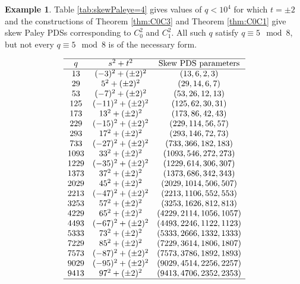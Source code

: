 \documentclass[12pt, a4paper]{article}
\theoremstyle{definition}
\newtheorem{example}[theorem]{Example}
\begin{document}
\begin{example}
Table \ref{tab:skewPaleye=4} gives values of $q<10^4$ for which $t=\pm 2$ and the constructions of Theorem \ref{thm:C0C3} and Theorem \ref{thm:C0C1} give skew Paley PDSs corresponding to $C_0^2$ and $C_1^2$. All such $q$ satisfy $q \equiv 5 \mod 8$, but not every $q \equiv 5 \mod 8$ is of the necessary form.

\begin{table}[h]
	\centering
	\[
	\begin{array}{ccc}
		\hline
		q & s^2+t^2 & \text{Skew PDS parameters} \\
		\hline
		13 & (-3)^2+(\pm2)^2 & (13,6,2,3) \\
		29 & 5^2+(\pm2)^2 & (29,14,6,7) \\
		53 & (-7)^2+(\pm2)^2 & (53,26,12,13) \\
		125 & (-11)^2+(\pm2)^2 & (125,62,30,31) \\
		173 & 13^2+(\pm2)^2 & (173,86,42,43) \\
		229 & (-15)^2+(\pm2)^2 & (229,114,56,57) \\
		293 & 17^2+(\pm2)^2 & (293,146,72,73) \\
		733 & (-27)^2+(\pm2)^2 & (733,366,182,183) \\
		1093 & 33^2+(\pm2)^2 & (1093,546,272,273) \\
		1229 & (-35)^2+(\pm2)^2 & (1229,614,306,307) \\
		1373 & 37^2+(\pm2)^2 & (1373,686,342,343) \\
		2029 & 45^2+(\pm2)^2 & (2029,1014,506,507) \\
		2213 & (-47)^2+(\pm2)^2 & (2213,1106,552,553) \\
		3253 & 57^2+(\pm2)^2 & (3253,1626,812,813) \\
		4229 & 65^2+(\pm2)^2 & (4229,2114,1056,1057) \\
		4493 & (-67)^2+(\pm2)^2 & (4493,2246,1122,1123) \\
		5333 & 73^2+(\pm2)^2 & (5333,2666,1332,1333) \\
		7229 & 85^2+(\pm2)^2 & (7229,3614,1806,1807) \\
		7573 & (-87)^2+(\pm2)^2 & (7573,3786,1892,1893) \\
		9029 & (-95)^2+(\pm2)^2 & (9029,4514,2256,2257) \\
		9413 & 97^2+(\pm2)^2 & (9413,4706,2352,2353) \\
		\hline
	\end{array}
	\]
	\caption{Skew PDSs from Theorem \ref{thm:C0C3} and Theorem \ref{thm:C0C1}.}
	\label{tab:skewPaleye=4}
\end{table}


\end{example}
\end{document}
